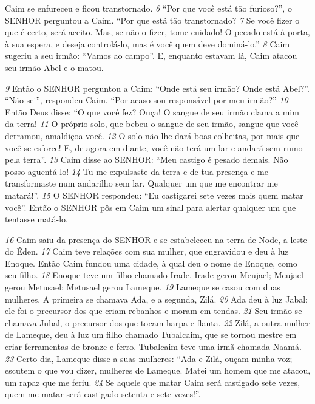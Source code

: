 \bigskip
Caim se enfureceu e ficou
transtornado.
\textit{\tiny 6}
“Por que você está tão furioso?”, o SENHOR perguntou a Caim. “Por que está tão
transtornado? 
\textit{\tiny 7}
Se você fizer o que é certo, será aceito. Mas, se não o fizer, tome
cuidado! O pecado está à porta, à sua espera, e deseja controlá-lo, mas é você
quem deve dominá-lo.”
\textit{\tiny 8}
Caim sugeriu a seu irmão: “Vamos ao campo”. E, enquanto estavam lá, Caim
atacou seu irmão Abel e o matou.

\bigskip
\textit{\tiny 9}
Então o SENHOR perguntou a Caim: “Onde está seu irmão? Onde está Abel?”.
   “Não sei”, respondeu Caim. “Por acaso sou responsável por meu irmão?”
\textit{\tiny 10}
Então Deus disse: “O que você fez? Ouça! O sangue de seu irmão clama a mim
da terra!  
\textit{\tiny 11}
O próprio solo, que bebeu o sangue de seu irmão, sangue que você
derramou, amaldiçoa você.  
\textit{\tiny 12}
O solo não lhe dará boas colheitas, por mais que
você se esforce! E, de agora em diante, você não terá um lar e andará sem rumo
pela terra”.
\textit{\tiny 13}
Caim disse ao SENHOR: “Meu castigo é pesado demais. Não posso aguentá-lo!
\textit{\tiny 14}
Tu me expulsaste da terra e de tua presença e me transformaste num andarilho
sem lar. Qualquer um que me encontrar me matará!”.
\textit{\tiny 15}
O SENHOR respondeu: “Eu castigarei sete vezes mais quem matar você”. Então
o SENHOR pôs em Caim um sinal para alertar qualquer um que tentasse matá-lo.

\bigskip
\textit{\tiny 16}
Caim saiu da presença do SENHOR e se estabeleceu na terra de Node, a leste do
Éden.
\textit{\tiny 17}
Caim teve relações com sua mulher, que engravidou e deu à luz Enoque. Então
Caim fundou uma cidade, à qual deu o nome de Enoque, como seu filho.
\textit{\tiny 18}
Enoque teve um filho chamado Irade. Irade gerou Meujael; Meujael gerou
Metusael; Metusael gerou Lameque.
\textit{\tiny 19}
Lameque se casou com duas mulheres. A primeira se chamava Ada, e a
segunda, Zilá.  
\textit{\tiny 20}
Ada deu à luz Jabal; ele foi o precursor dos que criam rebanhos e
moram em tendas.  
\textit{\tiny 21}
Seu irmão se chamava Jubal, o precursor dos que tocam
harpa e flauta.  
\textit{\tiny 22}
Zilá, a outra mulher de Lameque, deu à luz um filho chamado
Tubalcaim, que se tornou mestre em criar ferramentas de bronze e ferro.
Tubalcaim teve uma irmã chamada Naamá.  
\textit{\tiny 23}
Certo dia, Lameque disse a suas
mulheres:
  “Ada e Zilá, ouçam minha voz;
    escutem o que vou dizer, mulheres de Lameque.
  Matei um homem que me atacou,
    um rapaz que me feriu.
\textit{\tiny 24}
Se aquele que matar Caim será castigado sete vezes,
    quem me matar será castigado setenta e sete vezes!”.

